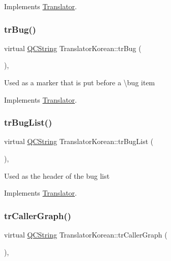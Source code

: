Implements \mbox{\hyperlink{class_translator}{Translator}}.

\mbox{\label{class_translator_korean_aebdfc5077da35af0f2c97e3af5b5ad68}} 
\subsubsection{\texorpdfstring{trBug()}{trBug()}}
{\footnotesize\ttfamily virtual \mbox{\hyperlink{class_q_c_string}{Q\+C\+String}} Translator\+Korean\+::tr\+Bug (\begin{DoxyParamCaption}{ }\end{DoxyParamCaption})\hspace{0.3cm}{\ttfamily [inline]}, {\ttfamily [virtual]}}

Used as a marker that is put before a \textbackslash{}bug item 

Implements \mbox{\hyperlink{class_translator}{Translator}}.

\mbox{\label{class_translator_korean_a0ce4e429855d853b7b88f51380c7f788}} 
\subsubsection{\texorpdfstring{trBugList()}{trBugList()}}
{\footnotesize\ttfamily virtual \mbox{\hyperlink{class_q_c_string}{Q\+C\+String}} Translator\+Korean\+::tr\+Bug\+List (\begin{DoxyParamCaption}{ }\end{DoxyParamCaption})\hspace{0.3cm}{\ttfamily [inline]}, {\ttfamily [virtual]}}

Used as the header of the bug list 

Implements \mbox{\hyperlink{class_translator}{Translator}}.

\mbox{\label{class_translator_korean_a5758b71ecd43c86e70bc4879f65e0067}} 
\subsubsection{\texorpdfstring{trCallerGraph()}{trCallerGraph()}}
{\footnotesize\ttfamily virtual \mbox{\hyperlink{class_q_c_string}{Q\+C\+String}} Translator\+Korean\+::tr\+Caller\+Graph (\begin{DoxyParamCaption}{ }\end{DoxyParamCaption})\hspace{0.3cm}{\ttfamily [inline]}, {\ttfamily [virtual]}}

